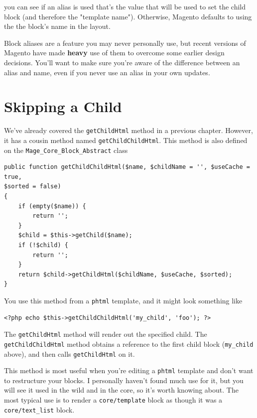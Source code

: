 \documentclass[oneside]{book}
\begin{document}
you can see if an alias is used that's the value that will be used to set the child block (and therefore the "template name").  Otherwise, Magento defaults to using the the block's name in the layout.

Block aliases are a feature you may never personally use, but recent versions of Magento have made \textbf{heavy} use of them to overcome some earlier design decisions. You'll want to make sure you're aware of the difference between an alias and name, even if you never use an alias in your own updates.

\section{Skipping a Child}

We've already covered the \footnotesize\texttt{getChildHtml} \normalsize  method in a previous chapter.  However, it has a cousin method named \footnotesize\texttt{getChildChildHtml}\normalsize.  This method is also defined on the \footnotesize\texttt{Mage\_Core\_Block\_Abstract} \normalsize  class

\begin{lstlisting}
public function getChildChildHtml($name, $childName = '', $useCache = true,
$sorted = false)
{
    if (empty($name)) {
        return '';
    }
    $child = $this->getChild($name);
    if (!$child) {
        return '';
    }
    return $child->getChildHtml($childName, $useCache, $sorted);
}

\end{lstlisting}


You use this method from a \footnotesize\texttt{phtml} \normalsize  template, and it might look something like

\begin{lstlisting}
<?php echo $this->getChildChildHtml('my_child', 'foo'); ?>

\end{lstlisting}


The \footnotesize\texttt{getChildHtml} \normalsize  method will render out the specified child.  The \footnotesize\texttt{getChildChildHtml} \normalsize  method obtains a reference to the first child block (\footnotesize\texttt{my\_child} \normalsize  above), and then calls \footnotesize\texttt{getChildHtml} \normalsize  on it.

This method is most useful when you're editing a \footnotesize\texttt{phtml} \normalsize  template and don't want to restructure your blocks.  I personally haven't found much use for it, but you will see it used in the wild and in the core, so it's worth knowing about.  The most typical use is to render a \footnotesize\texttt{core/template} \normalsize  block as though it was a \footnotesize\texttt{core/text\_list} \normalsize  block.
\end{document}

